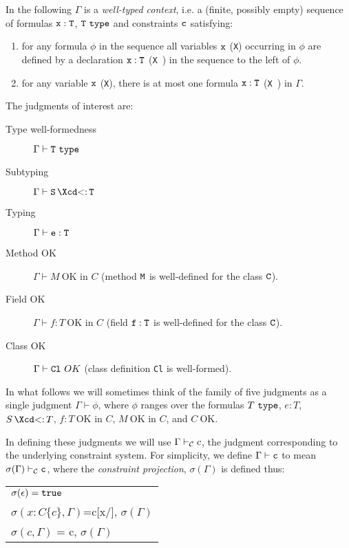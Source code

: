 In the following $\Gamma$ is a {\em well-typed context}, i.e.{} a
(finite, possibly empty) sequence of formulas $\tt x:T$, $\tt T\
\mbox{\tt type}$ and constraints $\tt c$ satisfying:
\begin{enumerate}
  \item for any formula $\phi$ in the sequence all variables $\tt x$
    ({\tt X}) occurring in $\phi$ are defined by a declaration $\tt
    x:T$ ({\tt X\ \type}) in the sequence to the left of $\phi$.

  \item for any variable $\tt x$ ({\tt X}), there is at most one
  formula $\tt x:T$ ({\tt X\ \type})  in $\Gamma$.
\end{enumerate}

The judgments of interest are:
\begin{description}
  \item[Type well-formedness]  $\Gamma \vdash {\tt T} \ {\tt type}$
  \item[Subtyping] $\Gamma \vdash {\tt S} \subtype {\tt T}$
  \item[Typing]    $\Gamma   \vdash {\tt e:T}$
  \item[Method OK] $\Gamma \vdash M\ \mbox{OK in $C$}$ (method $\tt M$ is well-defined for the class $\tt C$). 
  \item[Field OK]  $\Gamma \vdash f:T\ \mbox{OK in $C$}$ (field $\tt f:T$ is well-defined for the class $\tt C$).
  \item[Class OK] $\Gamma \vdash {\tt Cl} \ OK$ (class definition {\tt Cl} is well-formed). 
\end{description}


In what follows we will sometimes think of the family of five
judgments as a single judgment $\Gamma \vdash \phi$, where $\phi$
ranges over the formulas $T\ \tt type$, $e:T$, $S \subtype T$, $f:T\
\mbox{OK in $C$}$, $M\ \mbox{OK in $C$}$, and $C\ \mbox{OK}$.

In defining these judgments we will use $\Gamma \vdash_{\cal C} c$,
the judgment corresponding to the underlying constraint system. For simplicity,
we define $\Gamma \vdash {\tt c}$ to mean $\sigma(\Gamma)\vdash_{\cal C} {\tt c}$,
where the {\em constraint projection}, $\sigma(\Gamma)$ is defined thus:

\begin{tabular}{l}
$\sigma(\epsilon)={\tt true}$\\
$\sigma(x:C\{c\}, \Gamma)$=c[x/\self], $\sigma(\Gamma)$\\
$\sigma(c,\Gamma)$ = c, $\sigma(\Gamma)$
\end{tabular}

